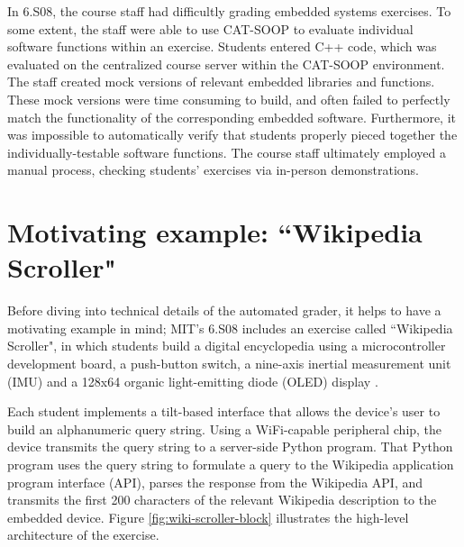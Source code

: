 \documentclass[12pt]{article}
\begin{document}
In 6.S08, the course staff had difficultly grading embedded systems exercises.  To some extent, the staff were able to use CAT-SOOP \cite{catsoop} to evaluate individual software functions within an exercise.  Students entered C++ code, which was evaluated on the centralized course server within the CAT-SOOP environment.  The staff created mock versions of relevant embedded libraries and functions.  These mock versions were time consuming to build, and often failed to perfectly match the functionality of the corresponding embedded software.  Furthermore, it was impossible to automatically verify that students properly pieced together the individually-testable software functions.  The course staff ultimately employed a manual process, checking students' exercises via in-person demonstrations.

\clearpage
\section{Motivating example: ``Wikipedia Scroller"}
\label{sec:wiki-scroller}
Before diving into technical details of the automated grader, it helps to have a motivating example in mind;  MIT's 6.S08 includes an exercise called ``Wikipedia Scroller", in which students build a digital encyclopedia using a microcontroller development board, a push-button switch, a nine-axis inertial measurement unit (IMU) and a 128x64 organic light-emitting diode (OLED) display \cite{wiki-scroller}.

Each student implements a tilt-based interface that allows the device's user to build an alphanumeric query string.  Using a WiFi-capable peripheral chip, the device transmits the query string to a server-side Python program.  That Python program uses the query string to formulate a query to the Wikipedia application program interface (API), parses the response from the Wikipedia API, and transmits the first 200 characters of the relevant Wikipedia description to the embedded device.  Figure \ref{fig:wiki-scroller-block} illustrates the high-level architecture of the exercise.
\end{document}

